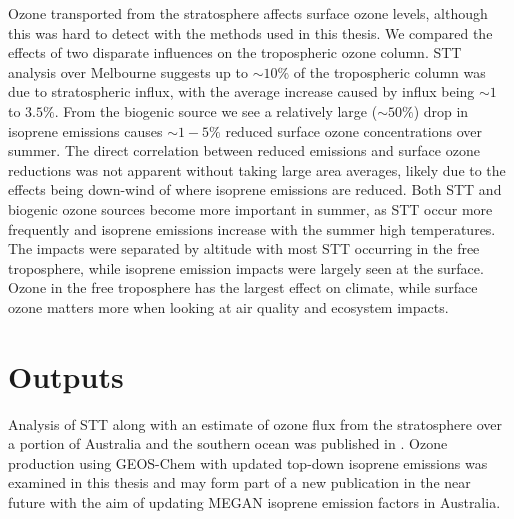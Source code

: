   
  Ozone transported from the stratosphere affects surface ozone levels, although this was hard to detect with the methods used in this thesis.
  We compared the effects of two disparate influences on the tropospheric ozone column.
  STT analysis over Melbourne suggests up to $\sim 10\%$ of the tropospheric column was due to stratospheric influx, with the average increase caused by influx being $\sim 1$ to $3.5\%$.
  From the biogenic source we see a relatively large ($\sim{50}\%$) drop in isoprene emissions causes $\sim{1-5}\%$ reduced surface ozone concentrations over summer.
  The direct correlation between reduced emissions and surface ozone reductions was not apparent without taking large area averages, likely due to the effects being down-wind of where isoprene emissions are reduced.
  Both STT and biogenic ozone sources become more important in summer, as STT occur more frequently and isoprene emissions increase with the summer high temperatures.
  The impacts were separated by altitude with most STT occurring in the free troposphere, while isoprene emission impacts were largely seen at the surface.
  Ozone in the free troposphere has the largest effect on climate, while surface ozone matters more when looking at air quality and ecosystem impacts.
  
  
  
\section{Outputs}
  \label{Conclusions:outputs}
  
  Analysis of STT along with an estimate of ozone flux from the stratosphere over a portion of Australia and the southern ocean was published in \textcite{Greenslade2017}.
  Ozone production using GEOS-Chem with updated top-down isoprene emissions was examined in this thesis and may form part of a new publication in the near future with the aim of updating MEGAN isoprene emission factors in Australia.
  
